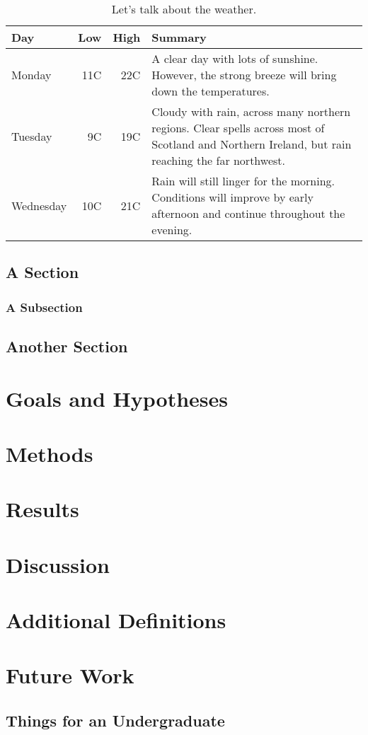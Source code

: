 \documentclass[twoside]{mtu.thesis}
\begin{document}
\lipsum[4-6]

\begin{table}
\caption{Let's talk about the weather.}
\centering
\begin{tabular}{lrrp{10cm}}
\hline
Day & Low & High & Summary \\\hline
Monday & 11C & 22C & A clear day with lots of sunshine. However, the strong breeze will bring down the temperatures. \\
Tuesday & 9C & 19C & Cloudy with rain, across many northern regions. Clear spells across most of Scotland and Northern Ireland, but rain reaching the far northwest. \\
Wednesday & 10C & 21C & Rain will still linger for the morning. Conditions will improve by early afternoon and continue throughout the evening. \\\hline
\end{tabular}
\end{table}

\lipsum[7-10]

\section{A Section}
\lipsum[10-12]

\subsection{A Subsection}
\lipsum[13]

\section{Another Section}
\lipsum[14-20]

\chapter{Goals and Hypotheses}
\lipsum[1-18]

\chapter{Methods}
\lipsum[1-20]

\chapter{Results}
\lipsum[1-20]

\chapter{Discussion}
\lipsum[1-20]

\nocite{*} %



\appendix

\chapter{Additional Definitions}
\lipsum[1-20]

\chapter{Future Work}
\lipsum[1-5]
\section{Things for an Undergraduate}
\lipsum[1-10]
\end{document}
